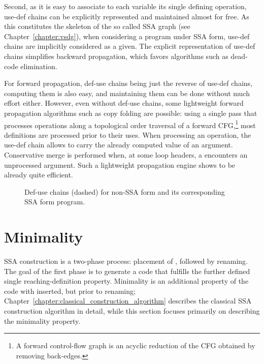 Second, as it is easy to associate to each variable its single defining operation, use-def chains can be explicitly represented and maintained almost for free. 
As this constitutes the skeleton of the so called SSA graph (see Chapter~\ref{chapter:vsdg}), when considering a program under SSA form, use-def chains are implicitly considered as a given. 
The explicit representation of use-def chains simplifies backward propagation, which favors algorithms such as dead-code elimination.

For forward propagation, def-use chains being just the reverse of use-def chains, computing them is also easy, and maintaining them can be done without much effort either. 
However, even without def-use chains, some lightweight forward propagation algorithms such as copy folding are possible: 
using a single pass that processes operations along a topological order traversal of a forward CFG,\footnote{A forward control-flow graph is an acyclic reduction of the CFG obtained by removing back-edges.} 
most definitions are processed prior to their uses. 
When processing an operation, the use-def chain allows to carry the already computed value of an argument. 
Conservative merge is performed when, at some loop headers, a \phifun encounters an unprocessed argument. 
Such a lightweight propagation engine shows to be already quite efficient.


\begin{figure}
\caption{Def-use chains (dashed) for non-SSA form and its corresponding SSA form program.}
\label{fig:properties_and_flavors:du} 
\end{figure}



\section{Minimality}
\label{sec:properties_and_flavors:minimality}

SSA construction is a two-phase process: 
placement of \phifuns, followed by renaming. 
The goal of the first phase is to generate a code that fulfills the further defined single reaching-definition property. 
Minimality is an additional property of the code with \phifuns inserted, but prior to renaming; 
Chapter~\ref{chapter:classical_construction_algorithm} describes the classical SSA construction algorithm in detail, while this section focuses primarily on describing the minimality property.

